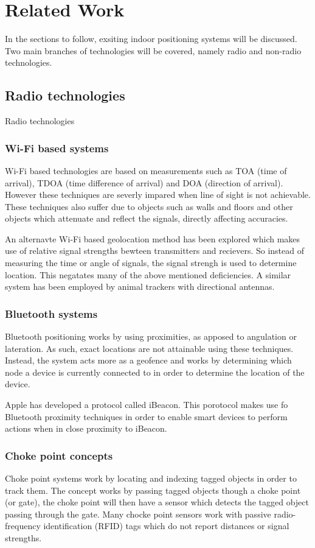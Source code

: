 \section{Related Work}
In the sections to follow, exsiting indoor positioning systems will be discussed. Two main branches of technologies will be covered, namely radio and non-radio technologies.

\subsection{Radio technologies}
Radio technologies

\subsubsection{Wi-Fi based systems}
Wi-Fi based technologies are based on measurements such as TOA (time of arrival), TDOA (time difference of arrival) and DOA (direction of arrival). However these techniques are severly impared when line of sight is not achievable. These techniques also suffer due to objects such as walls and floors and other objects which attenuate and reflect the signals, directly affecting accuracies.

An alternavte Wi-Fi based geolocation method has been explored which makes use of relative signal strengths bewteen transmitters and recievers. So instead of measuring the time or angle of signals, the signal strengh is used to determine location. This negatates many of the above mentioned deficiencies. A similar system has been employed by animal trackers with directional antennas.
\cite{yongguang_chen_signal_2002}

\subsubsection{Bluetooth systems}
Bluetooth positioning works by using proximities, as apposed to angulation or lateration. As such, exact locations are not attainable using these techniques. Instead, the system acts more as a geofence and works by determining which node a device is currently connected to in order to determine the location of the device.

Apple has developed a protocol called iBeacon. This porotocol makes use fo Bluetooth proximity techniques in order to enable smart devices to perform actions when in close proximity to iBeacon.
\cite{_everything_????}

\subsubsection{Choke point concepts}
Choke point systems work by locating and indexing tagged objects in order to track them. The concept works by passing tagged objects though a choke point (or gate), the choke point will then have a sensor which detects the tagged object passing through the gate. Many chocke point sensors work with passive radio-frequency identification (RFID) tags which do not report distances or signal strengths.
\cite{reza_investigation_2008}

